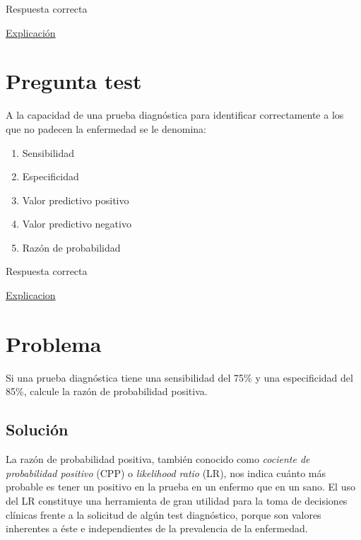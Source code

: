 \documentclass[
]{book}
\providecommand{\tightlist}{%
  \setlength{\itemsep}{0pt}\setlength{\parskip}{0pt}}
\begin{document}
Respuesta correcta

\href{https://www.elsevier.es/es-revista-educacion-medica-71-articulo-el-odds-ratio-su-interpretacion-S1575181317300360}{Explicación}

\hypertarget{pregunta-test-108}{%
\section{Pregunta test}\label{pregunta-test-108}}

A la capacidad de una prueba diagnóstica para identificar correctamente a los que no padecen la enfermedad se le denomina:

\begin{enumerate}
\def\labelenumi{\alph{enumi})}
\tightlist
\item
  Sensibilidad
\item
  Especificidad
\item
  Valor predictivo positivo
\item
  Valor predictivo negativo
\item
  Razón de probabilidad
\end{enumerate}

Respuesta correcta

\href{https://1fjmanzano.github.io/bioestadistica/relaci\%C3\%B3n-entre-variables-cualitativas.html\#diagno\%CC\%81stico-cli\%CC\%81nico}{Explicacion}

\hypertarget{problema-9}{%
\section{Problema}\label{problema-9}}

Si una prueba diagnóstica tiene una sensibilidad del 75\% y una especificidad del 85\%, calcule la razón de probabilidad positiva.

\hypertarget{soluciuxf3n-7}{%
\subsection{Solución}\label{soluciuxf3n-7}}

La razón de probabilidad positiva, también conocido como \emph{cociente de probabilidad positivo} (CPP) o \emph{likelihood ratio} (LR), nos indica cuánto más probable es tener un positivo en la prueba en un enfermo que en un sano. El uso del LR constituye una herramienta de gran utilidad para la toma de decisiones clínicas frente a la solicitud de algún test diagnóstico, porque son valores inherentes a éste e independientes de la prevalencia de la enfermedad.
\end{document}
